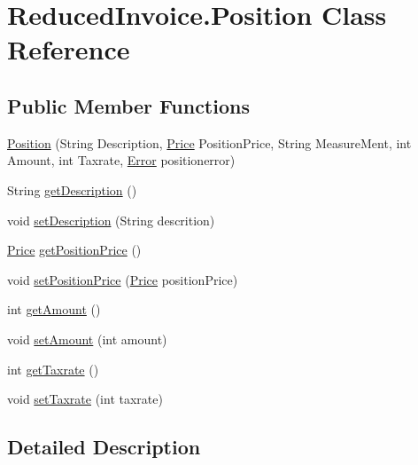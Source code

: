 \hypertarget{class_reduced_invoice_1_1_position}{\section{Reduced\-Invoice.\-Position Class Reference}
\label{class_reduced_invoice_1_1_position}
}
\subsection*{Public Member Functions}
\begin{DoxyCompactItemize}
\item 
\hyperlink{class_reduced_invoice_1_1_position_addc0dce10bd22dce5f94226b283bcf4d}{Position} (String Description, \hyperlink{class_reduced_invoice_1_1_price}{Price} Position\-Price, String Measure\-Ment, int Amount, int Taxrate, \hyperlink{enum_reduced_invoice_1_1_a_invoice_1_1_error}{Error} positionerror)
\item 
String \hyperlink{class_reduced_invoice_1_1_position_ab4c6da1a734c40337974e76ea4491dbf}{get\-Description} ()
\item 
void \hyperlink{class_reduced_invoice_1_1_position_a86b0bb99ef806d0e8298e8b5030f8964}{set\-Description} (String descrition)
\item 
\hyperlink{class_reduced_invoice_1_1_price}{Price} \hyperlink{class_reduced_invoice_1_1_position_ace39a33b2c836d4689b4eae38f6c3ca3}{get\-Position\-Price} ()
\item 
void \hyperlink{class_reduced_invoice_1_1_position_aeac9fdead656ad61a41dbca42a4d8fdd}{set\-Position\-Price} (\hyperlink{class_reduced_invoice_1_1_price}{Price} position\-Price)
\item 
int \hyperlink{class_reduced_invoice_1_1_position_a5f2aa6f49886d3186e53e76a55dfdf91}{get\-Amount} ()
\item 
void \hyperlink{class_reduced_invoice_1_1_position_afd4c38ea287c5e39f5537673f4efc1ce}{set\-Amount} (int amount)
\item 
int \hyperlink{class_reduced_invoice_1_1_position_ae6fa813dd7b205c91b5d340e467751da}{get\-Taxrate} ()
\item 
void \hyperlink{class_reduced_invoice_1_1_position_a44eab6fd92814298a7e34ff1ffd13422}{set\-Taxrate} (int taxrate)
\end{DoxyCompactItemize}


\subsection{Detailed Description}


